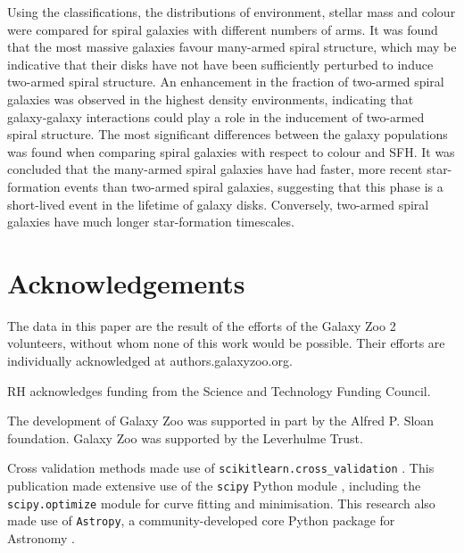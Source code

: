 \documentclass[useAMS,usenatbib]{mn2e}
\begin{document}
Using the classifications, the distributions of environment, stellar mass and colour were compared for spiral galaxies with different numbers of arms. It was found that the most massive galaxies favour many-armed spiral structure, which may be indicative that their disks have not have been sufficiently perturbed to induce two-armed spiral structure. An enhancement in the fraction of two-armed spiral galaxies was observed in the highest density environments, indicating that galaxy-galaxy interactions could play a role in the inducement of two-armed spiral structure. The most significant differences between the galaxy populations was found when comparing spiral galaxies with respect to colour and SFH. It was concluded that the many-armed spiral galaxies have had faster, more recent star-formation events than two-armed spiral galaxies, suggesting that this phase is a short-lived event in the lifetime of galaxy disks. Conversely, two-armed spiral galaxies have much longer star-formation timescales.


\section{Acknowledgements}

The data in this paper are the result of the efforts of the Galaxy Zoo 2 volunteers, without whom none of this work would be possible. Their efforts are individually acknowledged at authors.galaxyzoo.org.

RH acknowledges funding from the Science and Technology Funding Council.

The development of Galaxy Zoo was supported in part by the Alfred P. Sloan foundation. Galaxy Zoo was supported by the Leverhulme Trust.

Cross validation methods made use of \texttt{scikitlearn.cross\_validation} \citep{scikit-learn}. This publication made extensive use of the \texttt{scipy} Python module \citep{scipy}, including the \texttt{scipy.optimize} module for curve fitting and minimisation. This research also made use of \texttt{Astropy}, a community-developed core Python package for Astronomy \citep{astropy}.



\end{document}
